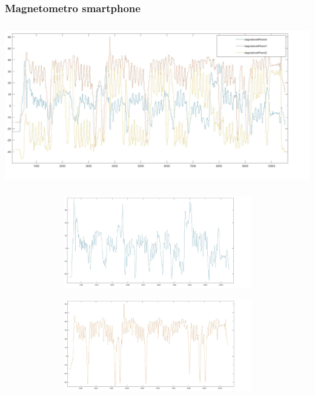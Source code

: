\documentclass[a4paper]{article}
\begin{document}
\subsubsection{Magnetometro smartphone}
\begin{minipage}{\linewidth}
\begin{center}
\includegraphics[width=160mm, height= 70mm]{./images/registrazione_tesi/mag_phXYZ.jpg} 
\end{center}
\end{minipage}
\makebox[\linewidth]{}
\makebox[\linewidth]{}\makebox[\linewidth]{}\makebox[\linewidth]{}
\makebox[\linewidth]{}\makebox[\linewidth]{}\makebox[\linewidth]{}
\makebox[\linewidth]{}\makebox[\linewidth]{}\makebox[\linewidth]{}

\begin{minipage}{\linewidth}
\begin{center}
\includegraphics[width=154mm, height= 40mm]{./images/registrazione_tesi/mag_phX.jpg} 
\end{center}
\end{minipage}

\begin{minipage}{\linewidth}
\begin{center}
\includegraphics[width=154mm, height= 40mm]{./images/registrazione_tesi/mag_phY.jpg} 
\end{center}
\end{minipage}
\makebox[\linewidth]{}
\end{document}
